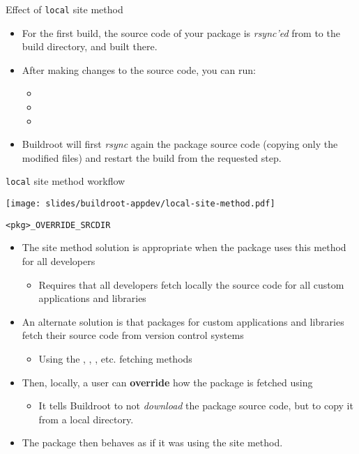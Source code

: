 \begin{frame}{Effect of {\tt local} site method}
  \begin{itemize}
  \item For the first build, the source code of your package is {\em
      rsync'ed} from  to the build directory, and
    built there.
  \item After making changes to the source code, you can run:
    \begin{itemize}
    \item {}
    \item {}
    \item {}
    \end{itemize}
  \item Buildroot will first {\em rsync} again the package source code
    (copying only the modified files) and restart the build from the
    requested step.
  \end{itemize}
\end{frame}

\begin{frame}{{\tt local} site method workflow}
  \begin{center}
    \texttt{[image: slides/buildroot-appdev/local-site-method.pdf]}
  \end{center}
\end{frame}

\begin{frame}{{\tt <pkg>\_OVERRIDE\_SRCDIR}}
  \begin{itemize}
  \item The  site method solution is appropriate when the
    package uses this method for all developers
    \begin{itemize}
    \item Requires that all developers fetch locally the source code
      for all custom applications and libraries
    \end{itemize}
  \item An alternate solution is that packages for custom applications
    and libraries fetch their source code from version control systems
    \begin{itemize}
    \item Using the , , , etc. fetching
      methods
    \end{itemize}
  \item Then, locally, a user can {\bf override} how the package is
    fetched using 
    \begin{itemize}
    \item It tells Buildroot to not {\em download} the package source
      code, but to copy it from a local directory.
    \end{itemize}
  \item The package then behaves as if it was using the 
    site method.
  \end{itemize}
\end{frame}

